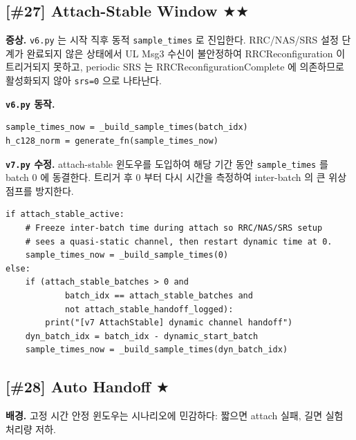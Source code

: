 \documentclass[11pt,a4paper]{article}
\newcommand{\sone}{\textcolor{starcolor}{$\bigstar$}}
\newcommand{\stwo}{\textcolor{starcolor}{$\bigstar\bigstar$}}
\newcommand{\vsix}{\texttt{v6.py}}
\newcommand{\vseven}{\texttt{v7.py}}
\newcommand{\bugitem}[3]{%
  \subsection{[\##1] #2 \hfill #3}%
  \vspace{-0.5em}%
}
\begin{document}
\bugitem{27}{Attach-Stable Window}{\stwo}

\textbf{증상.} \vsix{} 는 시작 직후 동적 \texttt{sample\_times} 로 진입한다.
RRC/NAS/SRS 설정 단계가 완료되지 않은 상태에서 UL Msg3 수신이 불안정하여
RRCReconfiguration 이 트리거되지 못하고, periodic SRS 는
RRCReconfigurationComplete 에 의존하므로 활성화되지 않아 \texttt{srs=0} 으로
나타난다.

\textbf{\vsix{} 동작.}
\begin{lstlisting}[caption={v6.py: lines 2119--2120 (시작과 동시에 동적)}]
sample_times_now = _build_sample_times(batch_idx)
h_c128_norm = generate_fn(sample_times_now)
\end{lstlisting}

\textbf{\vseven{} 수정.} attach-stable 윈도우를 도입하여 해당 기간 동안
\texttt{sample\_times} 를 batch 0 에 동결한다. 트리거 후 0 부터 다시
시간을 측정하여 inter-batch 의 큰 위상 점프를 방지한다.
\begin{lstlisting}[caption={v7.py: lines 2186--2196}]
if attach_stable_active:
    # Freeze inter-batch time during attach so RRC/NAS/SRS setup
    # sees a quasi-static channel, then restart dynamic time at 0.
    sample_times_now = _build_sample_times(0)
else:
    if (attach_stable_batches > 0 and
            batch_idx == attach_stable_batches and
            not attach_stable_handoff_logged):
        print("[v7 AttachStable] dynamic channel handoff")
    dyn_batch_idx = batch_idx - dynamic_start_batch
    sample_times_now = _build_sample_times(dyn_batch_idx)
\end{lstlisting}

\bugitem{28}{Auto Handoff}{\sone}

\textbf{배경.} 고정 시간 안정 윈도우는 시나리오에 민감하다: 짧으면 attach
실패, 길면 실험 처리량 저하.
\end{document}

